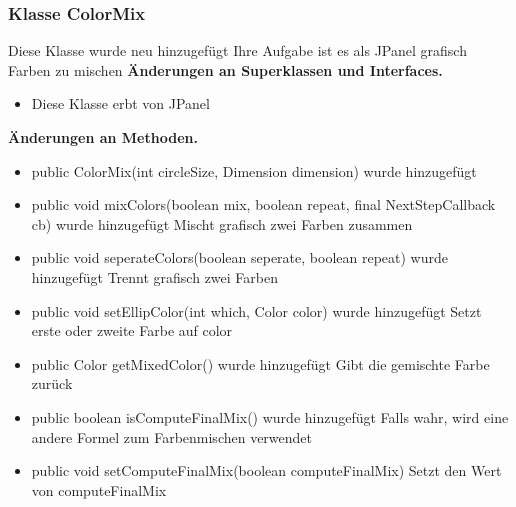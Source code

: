 \documentclass{article}
\begin{document}
	\subsubsection{Klasse ColorMix}
    Diese Klasse wurde neu hinzugefügt
    Ihre Aufgabe ist es als JPanel grafisch Farben zu mischen
	    \textbf{Änderungen an Superklassen und Interfaces.}\newline
	   \begin{itemize}
            \item Diese Klasse erbt von JPanel\newline
           \end{itemize}
    \textbf{Änderungen an Methoden.}\newline
	   \begin{itemize}
           \item public ColorMix(int circleSize, Dimension dimension) wurde hinzugefügt\newline
           \item public void mixColors(boolean mix, boolean repeat, final NextStepCallback cb) wurde hinzugefügt\newline
               Mischt grafisch zwei Farben zusammen
           \item public void seperateColors(boolean seperate, boolean repeat) wurde hinzugefügt\newline
               Trennt grafisch zwei Farben
           \item public void setEllipColor(int which, Color color) wurde hinzugefügt\newline
               Setzt erste oder zweite Farbe auf color
           \item public Color getMixedColor() wurde hinzugefügt\newline
               Gibt die gemischte Farbe zurück
           \item public boolean isComputeFinalMix() wurde hinzugefügt\newline
               Falls wahr, wird eine andere Formel zum Farbenmischen verwendet
           \item public void setComputeFinalMix(boolean computeFinalMix)\newline
               Setzt den Wert von computeFinalMix
           \end{itemize}
\end{document}
